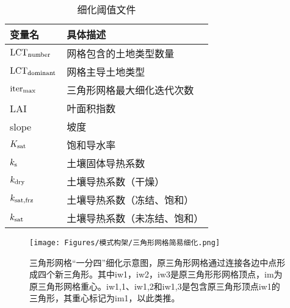 {
  \begin{table}[htbp]
    \centering
    \caption{细化阈值文件}
    \label{tab:细化阈值文件}
    \begin{tabular}{@{}ll@{}}
      \toprule
      变量名                       & 具体描述                     \\ \midrule
      ${\rm LCT}_{\rm number}$     & 网格包含的土地类型数量       \\
      ${\rm LCT}_{\rm dominant}$   & 网格主导土地类型             \\
      ${\rm iter}_{\rm max}$       & 三角形网格最大细化迭代次数   \\
      LAI                          & 叶面积指数                   \\
      slope                        & 坡度                         \\
      $K_{\rm sat}$                & 饱和导水率                   \\
      $k_{\rm s}$                  & 土壤固体导热系数             \\
      $k_{\rm dry}$                & 土壤导热系数（干燥）         \\
      $k_{\rm sat,frz}$            & 土壤导热系数（冻结、饱和）   \\
      $k_{\rm sat}$                & 土壤导热系数（未冻结、饱和） \\ \bottomrule
    \end{tabular}
  \end{table}
}

{
  \begin{figure}[htbp]
    \centering
    \texttt{[image: Figures/模式构架/三角形网格简易细化.png]}
    \caption{三角形网格“一分四”细化示意图，原三角形网格通过连接各边中点形成四个新三角形。其中iw1，iw2，iw3是原三角形形网格顶点，im为原三角形网格重心。iw1,1、iw1,2和iw1,3是包含原三角形顶点iw1的三角形，其重心标记为im1，以此类推。}
    \label{fig:三角形网格简易细化}
  \end{figure}
}

